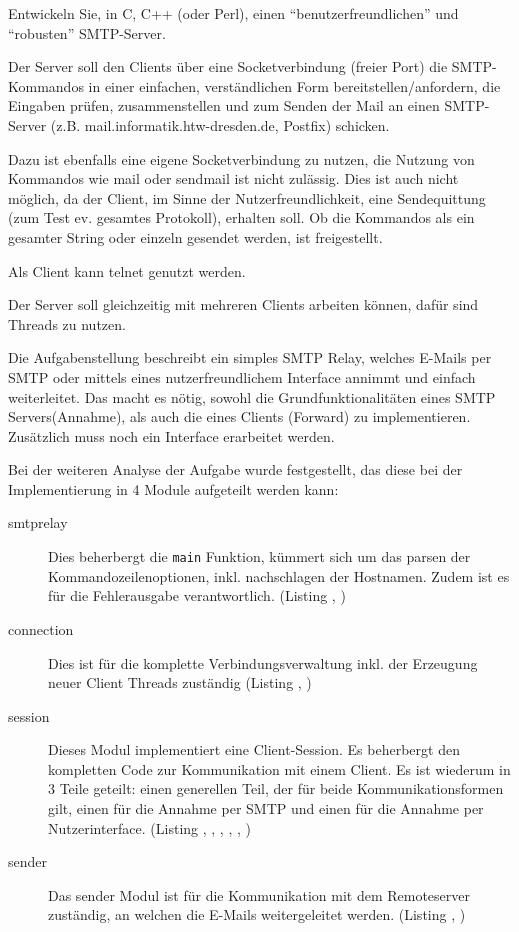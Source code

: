 
Entwickeln Sie, in C, C++ (oder Perl), einen "`benutzerfreundlichen"' und "`robusten"' SMTP-Server.

Der Server soll den Clients \"{u}ber eine Socketverbindung (freier Port) die SMTP-Kommandos in einer einfachen, verst\"{a}ndlichen Form bereitstellen/anfordern, die Eingaben pr\"{u}fen, zusammenstellen und zum Senden der Mail an einen SMTP-Server (z.B. mail.informatik.htw-dresden.de, Postfix) schicken. 

Dazu ist ebenfalls eine eigene Socketverbindung zu nutzen, die Nutzung von Kommandos wie mail oder sendmail ist nicht zul\"{a}ssig. Dies ist auch nicht m\"{o}glich, da der Client, im Sinne der Nutzerfreundlichkeit, eine Sendequittung (zum Test ev. gesamtes Protokoll), erhalten soll. Ob die Kommandos als ein gesamter String oder einzeln gesendet werden, ist freigestellt.

Als Client kann telnet genutzt werden.

Der Server soll gleichzeitig mit mehreren Clients arbeiten k\"{o}nnen, daf\"{u}r sind Threads zu nutzen.

Die Aufgabenstellung beschreibt ein simples SMTP Relay, welches E-Mails per SMTP oder mittels eines nutzerfreundlichem Interface annimmt und einfach weiterleitet. Das macht es n\"{o}tig, sowohl die Grundfunktionalit\"{a}ten eines SMTP Servers(Annahme), als auch die eines Clients (Forward) zu implementieren. Zus\"{a}tzlich muss noch ein Interface erarbeitet werden.

Bei der weiteren Analyse der Aufgabe wurde festgestellt, das diese bei der Implementierung in 4 Module aufgeteilt werden kann:
\begin{description}
  \item[smtprelay]
    Dies beherbergt die \texttt{main} Funktion, k\"{u}mmert sich um das parsen der Kommandozeilenoptionen, inkl. nachschlagen der Hostnamen. Zudem ist es f\"{u}r die Fehlerausgabe verantwortlich. (Listing , ) 
  \item[connection] 
    Dies ist f\"{u}r die komplette Verbindungsverwaltung inkl. der Erzeugung neuer Client Threads zust\"{a}ndig (Listing , )
  \item[session] 
    Dieses Modul implementiert eine Client-Session. Es beherbergt den kompletten Code zur Kommunikation mit einem Client. Es ist wiederum in 3 Teile geteilt: einen generellen Teil, der f\"{u}r beide Kommunikationsformen gilt, einen f\"{u}r die Annahme per SMTP und einen f\"{u}r die Annahme per Nutzerinterface. (Listing , , , , , )
  \item[sender] 
    Das sender Modul ist f\"{u}r die Kommunikation mit dem Remoteserver zust\"{a}ndig, an welchen die E-Mails weitergeleitet werden. (Listing , )
\end{description}

